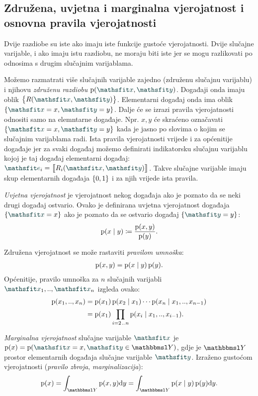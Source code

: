 \documentclass[utf8, diplomski, lmodern]{fer}
\begin{document}
\subsection{Združena, uvjetna i marginalna vjerojatnost i osnovna pravila vjerojatnosti}

Dvije razdiobe su iste ako imaju iste funkcije gustoće vjerojatnosti. Dvije slučajne varijable, i ako imaju istu razdiobu, ne moraju biti iste jer se mogu razlikovati po odnosima s drugim slučajnim varijablama.

Možemo razmatrati više slučajnih varijable zajedno (združenu slučajnu varijablu) i njihovu \emph{združenu razdiobu} $\p(\rvar x,\rvar y)$. Događaji onda imaju oblik $\cbr{R(\rvar x,\rvar y)}$. Elementarni događaj onda ima oblik $\cbr{\rvar x=x, \rvar y=y}$. Dalje će se izrazi pravila vjerojatnosti odnositi samo na elemntarne događaje. Npr. $x, y$ će skraćeno označavati $\cbr{\rvar x=x, \rvar y=y}$ kada je jasno po slovima o kojim se slučajnim varijablama radi. Ista pravila vjerojatnosti vrijede i za općenitije događaje jer za svaki događaj možemo definirati indikatorsku slučajnu varijablu kojoj je taj događaj elementarni događaj: $\rvar e_i = \enbbracket{R_i(\rvar x, \rvar y)}$. Takve slučajne varijable imaju skup elementarnih događaja $\cbr{0,1}$ i za njih vrijede ista pravila.

\emph{Uvjetna vjerojatnost} je vjerojatnost nekog događaja ako je poznato da se neki drugi događaj ostvario. Ovako je definirana uvjetna vjerojatnost događaja $\cbr{\rvar x=x}$ ako je poznato da se ostvario događaj $\cbr{\rvar y=y}$:
\begin{align} \label{eq:uvjetna-vj}
\operatorname*{\mathrm{p}}(x\mid y) \coloneqq \frac{\operatorname*{\mathrm{p}}(x,y)}{\operatorname*{\mathrm{p}}(y)}  \text{.}
\end{align}

Združena vjerojatnost se može rastaviti \emph{pravilom umnoška}: 
\begin{align}
\operatorname*{\mathrm{p}}(x,y) = \operatorname*{\mathrm{p}}(x\mid y)\operatorname*{\mathrm{p}}(y) \text{.}
\end{align}
Općenitije, pravilo umnoška za $n$ slučajnih varijabli $\rvar x_1,..,\rvar x_n$ izgleda ovako:
\begin{align} \label{eq:pravilo-umnoska}
\operatorname*{\mathrm{p}}(x_1,..,x_n) 
&=\operatorname*{\mathrm{p}}(x_1)\operatorname*{\mathrm{p}}(x_2\mid x_1)\cdots\operatorname*{\mathrm{p}}(x_n\mid x_1,..,x_{n-1})  \\
&=\operatorname*{\mathrm{p}}(x_1)\prod_{i=2\mkern1.5mu{..}\mkern1.5mu n}\operatorname*{\mathrm{p}}(x_i\mid x_1,..,x_{i-1})  \text{.}
\end{align}

\emph{Marginalna vjerojatnost} slučajne varijable $\rvar x$ je $\p(x)=\p(\rvar x=x,\rvar y\in\set Y)$, gdje je $\set Y$ prostor elementarnih događaja slučajne varijable $\rvar y$. Izraženo gustoćom vjerojatnosti (\emph{pravilo zbroja}, \emph{marginalizacija}):
\begin{align}
\p(x) = \int_{\set Y}\p(x,y)\dif y = \int_{\set Y}\p(x\mid y)\p(y)\dif y \text{.}
\end{align}
\end{document}
